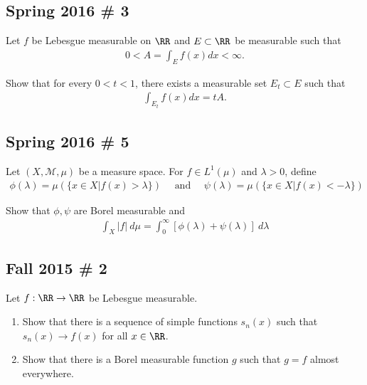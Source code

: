 \hypertarget{spring-2016-3}{%
\subsection{Spring 2016 \# 3}\label{spring-2016-3}}

Let \(f\) be Lebesgue measurable on \(\RR\) and \(E \subset \RR\) be
measurable such that
\begin{align*}
0<A=\int_{E} f(x) d x<\infty.
\end{align*}

Show that for every \(0 < t < 1\), there exists a measurable set
\(E_t \subset E\) such that
\begin{align*}
\int_{E_{t}} f(x) d x=t A.
\end{align*}

\hypertarget{spring-2016-5}{%
\subsection{Spring 2016 \# 5}\label{spring-2016-5}}

Let \((X, \mathcal M, \mu)\) be a measure space. For \(f\in L^1(\mu)\)
and \(\lambda > 0\), define
\begin{align*}
\phi(\lambda)=\mu(\{x \in X | f(x)>\lambda\}) 
\quad \text { and } \quad 
\psi(\lambda)=\mu(\{x \in X | f(x)<-\lambda\})
\end{align*}

Show that \(\phi, \psi\) are Borel measurable and
\begin{align*}
\int_{X}|f| ~d \mu=\int_{0}^{\infty}[\phi(\lambda)+\psi(\lambda)] ~d \lambda
\end{align*}

\hypertarget{fall-2015-2}{%
\subsection{Fall 2015 \# 2}\label{fall-2015-2}}

Let \(f: \RR \to \RR\) be Lebesgue measurable.

\begin{enumerate}
\def\labelenumi{\arabic{enumi}.}
\tightlist
\item
  Show that there is a sequence of simple functions \(s_n(x)\) such that
  \(s_n(x) \to f(x)\) for all \(x\in \RR\).
\item
  Show that there is a Borel measurable function \(g\) such that
  \(g = f\) almost everywhere.
\end{enumerate}

